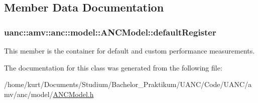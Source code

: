 \subsection{Member Data Documentation}
\subsubsection[{\texorpdfstring{default\+Register}{defaultRegister}}]{ uanc\+::amv\+::anc\+::model\+::\+A\+N\+C\+Model\+::default\+Register}\hypertarget{classuanc_1_1amv_1_1anc_1_1model_1_1_a_n_c_model_a1e7a3078128b1b92eda1e0bbfbfaa610}{}\label{classuanc_1_1amv_1_1anc_1_1model_1_1_a_n_c_model_a1e7a3078128b1b92eda1e0bbfbfaa610}
This member is the container for default and custom performance measurements. 

The documentation for this class was generated from the following file\+:\begin{DoxyCompactItemize}
\item 
/home/kurt/\+Documents/\+Studium/\+Bachelor\+\_\+\+Praktikum/\+U\+A\+N\+C/\+Code/\+U\+A\+N\+C/amv/anc/model/\hyperlink{_a_n_c_model_8h}{A\+N\+C\+Model.\+h}\end{DoxyCompactItemize}
